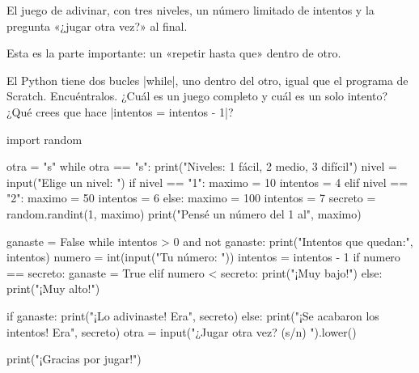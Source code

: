 
El juego de adivinar, con tres niveles, un número limitado de intentos y la pregunta «¿jugar otra vez?» al final.

Esta es la parte importante: un «repetir hasta que» dentro de otro.

\begin{center}
\begin{scratch}
\end{scratch}
\end{center}

\begin{think}
El Python tiene dos bucles \py|while|, uno dentro del otro, igual que el programa de Scratch. Encuéntralos. ¿Cuál es un juego completo y cuál es un solo intento? ¿Qué crees que hace \py|intentos = intentos - 1|?
\end{think}

\begin{typethis}
import random

otra = "s"
while otra == "s":
    print("Niveles: 1 fácil, 2 medio, 3 difícil")
    nivel = input("Elige un nivel: ")
    if nivel == "1":
        maximo = 10
        intentos = 4
    elif nivel == "2":
        maximo = 50
        intentos = 6
    else:
        maximo = 100
        intentos = 7
    secreto = random.randint(1, maximo)
    print("Pensé un número del 1 al", maximo)

    ganaste = False
    while intentos > 0 and not ganaste:
        print("Intentos que quedan:", intentos)
        numero = int(input("Tu número: "))
        intentos = intentos - 1
        if numero == secreto:
            ganaste = True
        elif numero < secreto:
            print("¡Muy bajo!")
        else:
            print("¡Muy alto!")

    if ganaste:
        print("¡Lo adivinaste! Era", secreto)
    else:
        print("¡Se acabaron los intentos! Era", secreto)
    otra = input("¿Jugar otra vez? (s/n) ").lower()

print("¡Gracias por jugar!")
\end{typethis}

